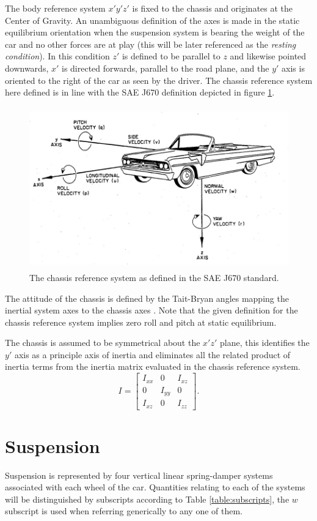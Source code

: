 The body reference system $x'y'z'$ is fixed to the chassis and originates at the Center of Gravity. An unambiguous definition of the axes is made in the static equilibrium orientation when the suspension system is bearing the weight of the car and no other forces are at play (this will be later referenced as the \textit{resting condition}). In this condition $z'$ is defined to be parallel to $z$ and likewise pointed downwards, $x'$ is directed forwards, parallel to the road plane, and the $y'$ axis is oriented to the right of the car as seen by the driver. The chassis reference system here defined is in line with the SAE J670 definition depicted in figure \ref{saeaxes}.
\begin{figure}[ht]
  \centering
  \includegraphics[height = 7cm]{images/saeaxes}
  \caption{The chassis reference system as defined in the SAE J670 standard.}
  \label{saeaxes}
\end{figure}

The attitude of the chassis is defined by the Tait-Bryan angles mapping the inertial system axes to the chassis axes . Note that the given definition for the chassis reference system implies zero roll and pitch at static equilibrium.

The chassis is assumed to be symmetrical about the $x'z'$ plane, this identifies the $y'$ axis as a principle axis of inertia and eliminates all the related product of inertia terms from the inertia matrix evaluated in the chassis reference system.
$$
I = \begin{bmatrix}
I_{xx} & 0      & I_{xz}\\
0      & I_{yy} & 0     \\
I_{xz} & 0      & I_{zz}
\end{bmatrix}.
$$

\section{Suspension}
\label{sec:suspension}
Suspension is represented by four vertical linear spring-damper systems associated with each wheel of the car. Quantities relating to each of the systems will be distinguished by subscripts according to Table \ref{table:subscripts}, the $w$ subscript is used when referring generically to any one of them.

